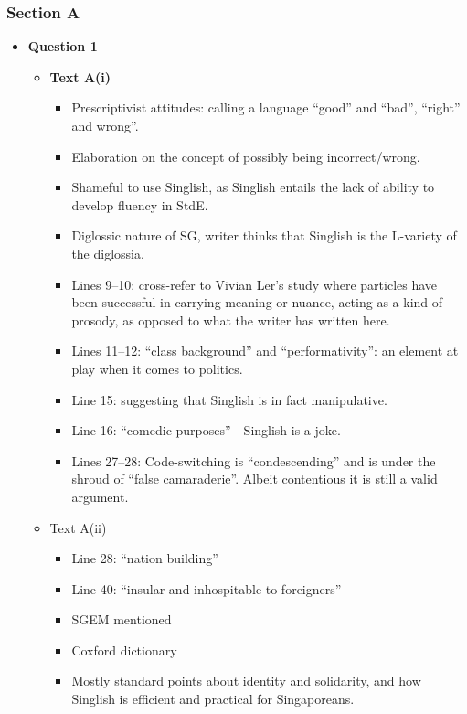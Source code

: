 \documentclass[../main.tex]{subfiles}
\begin{document}
			\subsubsection*{Section A}
				\begin{itemize}
					\item \textbf{Question 1} \begin{itemize}
						\item \textbf{Text A(i)} \begin{itemize}
							\item Prescriptivist attitudes: calling a language ``good'' and ``bad'', ``right'' and wrong''.
							\item Elaboration on the concept of possibly being incorrect/wrong.
							\item Shameful to use Singlish, as Singlish entails the lack of ability to develop fluency in StdE.
							\item Diglossic nature of SG, writer thinks that Singlish is the L-variety of the diglossia.
							\item Lines 9--10: cross-refer to Vivian Ler's study where particles have been successful in carrying meaning or nuance, acting as a kind of prosody, as opposed to what the writer has written here.
							\item Lines 11--12: ``class background'' and ``performativity'': an element at play when it comes to politics.
							\item Line 15: suggesting that Singlish is in fact manipulative.
							\item Line 16: ``comedic purposes''---Singlish is a joke.
							\item Lines 27--28: Code-switching is ``condescending'' and is under the shroud of ``false camaraderie''. Albeit contentious it is still a valid argument.
						\end{itemize}
						\item Text A(ii) \begin{itemize}
							\item Line 28: ``nation building''
							\item Line 40: ``insular and inhospitable to foreigners''
							\item SGEM mentioned
							\item Coxford dictionary
							\item Mostly standard points about identity and solidarity, and how Singlish is efficient and practical for Singaporeans.
						\end{itemize}
					\end{itemize}


\end{itemize}
\end{document}
